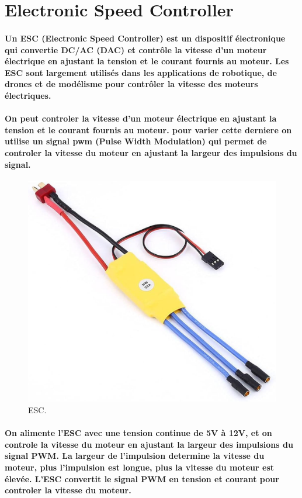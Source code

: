 \section{Electronic Speed Controller}

\paragraph{Un ESC (Electronic Speed Controller) est un dispositif électronique qui convertie DC/AC (DAC) et contrôle la vitesse d'un moteur électrique en ajustant la tension et le courant fournis au moteur. Les ESC sont largement utilisés dans les applications de robotique, de drones et de modélisme pour contrôler la vitesse des moteurs électriques.}

\paragraph{On peut controler la vitesse d'un moteur électrique en ajustant la tension et le courant fournis au moteur. pour varier cette derniere on utilise un signal \acrshort{pwm} (Pulse Width Modulation) qui permet de controler la vitesse du moteur en ajustant la largeur des impulsions du signal.}

\begin{figure}[!htpb]
	\centering
	\includegraphics[width=0.7\linewidth]{Figures/esc.jpg}
	\caption[ESC]{ESC.}
\end{figure}

\paragraph{
	On alimente l'ESC avec une tension continue de 5V à 12V, et on controle la vitesse du moteur en ajustant la largeur des impulsions du signal PWM. La largeur de l'impulsion determine la vitesse du moteur, plus l'impulsion est longue, plus la vitesse du moteur est élevée. L'ESC convertit le signal PWM en tension et courant pour controler la vitesse du moteur.
}


